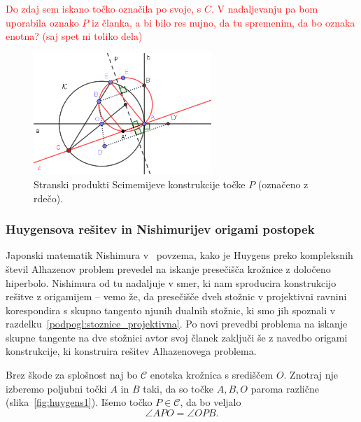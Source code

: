 \textcolor{red}{Do zdaj sem iskano točko označila po svoje, s $C$. V nadaljevanju pa bom uporabila oznako $P$ iz članka, a bi bilo res nujno, da tu spremenim, da bo oznaka enotna? (saj spet ni toliko dela)}


\begin{figure}[h]
    \centering
    \includegraphics[width=0.6\textwidth]{images/alhazen/scimemi_stransko.png}
    \caption[Stranski produkt Scimemija]{Stranski produkti Scimemijeve konstrukcije točke $P$ (označeno z rdečo).}
    \label{fig:scimemi_opomba}
\end{figure}

\subsubsection*{Huygensova rešitev in Nishimurijev origami postopek}

Japonski matematik Nishimura v~\cite{nishimura2018} povzema, kako je Huygens preko kompleksnih števil Alhazenov problem prevedel na iskanje presečišča krožnice z določeno hiperbolo. Nishimura od tu nadaljuje v smer, ki nam sproducira konstrukcijo rešitve z origamijem -- vemo že, da presečišče dveh stožnic v projektivni ravnini korespondira s skupno tangento njunih dualnih stožnic, ki smo jih spoznali v razdelku~\ref{podpogl:stoznice_projektivna}. Po novi prevedbi problema na iskanje skupne tangente na dve stožnici avtor svoj članek zaključi še z navedbo origami konstrukcije, ki konstruira rešitev Alhazenovega problema.

Brez škode za splošnost naj bo $\mathcal{C}$ enotska krožnica s središčem $O$. Znotraj nje izberemo poljubni točki $A$ in $B$ taki, da so točke $A,B,O$ paroma različne (slika~\ref{fig:huygens1}). Išemo točko $P \in \mathcal{C}$, da bo veljalo
\begin{equation}
    \label{eq:huygens_pogoj}
    \angle APO = \angle OPB.
\end{equation}

